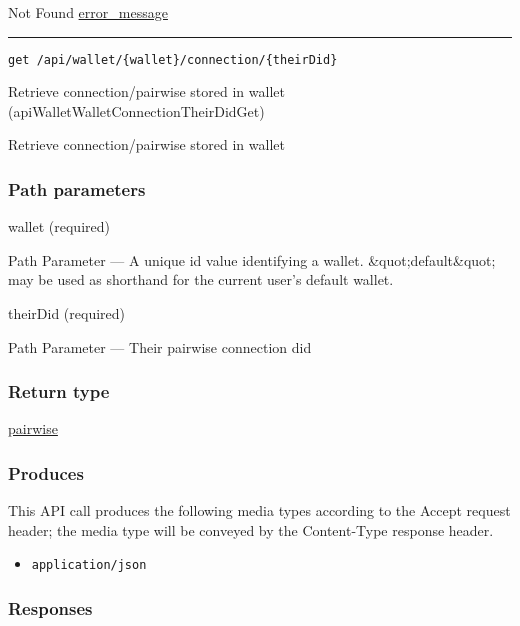 Not Found \protect\hyperlink{error_message}{error\_message}

\begin{center}\rule{0.5\linewidth}{\linethickness}\end{center}

\protect\hypertarget{apiWalletWalletConnectionTheirDidGet}{}{}

\begin{verbatim}
get /api/wallet/{wallet}/connection/{theirDid}
\end{verbatim}

Retrieve connection/pairwise stored in wallet
({apiWalletWalletConnectionTheirDidGet})

Retrieve connection/pairwise stored in wallet

\hypertarget{path-parameters-71}{%
\subsubsection{Path parameters}\label{path-parameters-71}}

wallet (required)

{Path Parameter} --- A unique id value identifying a wallet.
\&quot;default\&quot; may be used as shorthand for the current user's
default wallet.

theirDid (required)

{Path Parameter} --- Their pairwise connection did

\hypertarget{return-type-103}{%
\subsubsection{Return type}\label{return-type-103}}

\protect\hyperlink{pairwise}{pairwise}

\hypertarget{produces-132}{%
\subsubsection{Produces}\label{produces-132}}

This API call produces the following media types according to the
{Accept} request header; the media type will be conveyed by the
{Content-Type} response header.

\begin{itemize}
\tightlist
\item
  \texttt{application/json}
\end{itemize}

\hypertarget{responses-135}{%
\subsubsection{Responses}\label{responses-135}}

